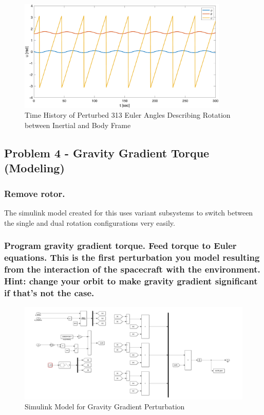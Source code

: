 \begin{figure}[H]
    \centering
    \captionsetup{justification = centering}
    \includegraphics[width = 10cm]{Images/PS4/mom_wheel_mission_stability_history_angles.png}
    \caption{Time History of Perturbed 313 Euler Angles Describing Rotation between Inertial and Body Frame}
    \label{fig:mom_wheel_mission_stability_angles}
\end{figure}

\subsection{Problem 4 - Gravity Gradient Torque (Modeling)}

\subsubsection{Remove rotor.}

The simulink model created for this uses variant subsystems to switch between the single and dual rotation configurations very easily.

\subsubsection{Program gravity gradient torque. Feed torque to Euler equations. This is the first perturbation you
model resulting from the interaction of the spacecraft with the environment. Hint: change your orbit
to make gravity gradient significant if that’s not the case.}

\begin{figure}[H]
    \centering
    \captionsetup{justification = centering}
    \includegraphics[width = 15cm]{Images/PS4/gravity_gradiant_simulink_model.png}
    \caption{Simulink Model for Gravity Gradient Perturbation}
    \label{fig:grav_gradient_simulink}
\end{figure}

